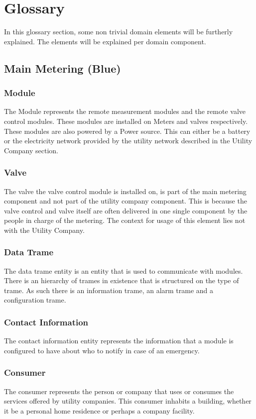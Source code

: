 \section{Glossary}
In this glossary section, some non trivial domain elements will be furtherly explained.
The elements will be explained per domain component.
\subsection{Main Metering (Blue)}
\subsubsection{Module}
The Module represents the remote measurement modules and the remote valve control modules.
These modules are installed on Meters and valves respectively. These modules are also powered by a Power source. This can either be a battery or the electricity network provided by the utility network described in the Utility Company section.
\subsubsection{Valve}
The valve the valve control module is installed on, is part of the main metering component and not part of the utility company component. This is because the valve control and valve itself are often delivered in one single component by the people in charge of the metering. 
The context for usage of this element lies not with the Utility Company. 
\subsubsection{Data Trame}
The data trame entity is an entity that is used to communicate with modules. There is an hierarchy of trames in existence that is structured on the type of trame. 
As such there is an information trame, an alarm trame and a configuration trame. 
\subsubsection{Contact Information}
The contact information entity represents the information that a module is configured to have about who to notify in case of an emergency.
\subsubsection{Consumer}
The consumer represents the person or company that uses or consumes the services offered by utility companies. This consumer inhabits a building,
whether it be a personal home residence or perhaps a company facility.

